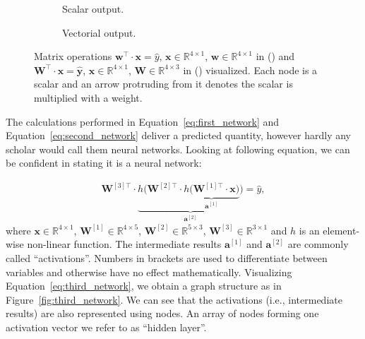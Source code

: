 \begin{figure}[!htb]
    \centering
    \begin{subfigure}{0.4\textwidth}
      \centering
    
      \caption{Scalar output.}
      \label{fig:first_network}
  \end{subfigure}
  \begin{subfigure}{0.4\textwidth}
      \centering
    
      \caption{Vectorial output.}
      \label{fig:second_network}
  \end{subfigure}
  \caption{Matrix operations $\bm{w}^\top \cdot \bm{x} = \hat{y}$, $\bm{x} \in \mathds{R}^{4 \times 1}$, $\bm{w} \in \mathds{R}^{4 \times 1}$ in () and $\bm{W}^\top \cdot \bm{x} = \hat{\bm{y}}$, $\bm{x} \in \mathds{R}^{4 \times 1}$, $\bm{W} \in \mathds{R}^{4 \times 3}$ in () visualized. Each node is a scalar and an arrow protruding from it denotes the scalar is multiplied with a weight.}
\label{fig:first_second_network}
\end{figure}
\FloatBarrier

\noindent The calculations performed in Equation~\ref{eq:first_network} and Equation~\ref{eq:second_network} deliver a predicted quantity, however hardly any scholar would call them neural networks. Looking at following equation, we can be confident in stating it is a neural network:

\begin{align} \label{eq:third_network}
    \bm{W}^{[3]\top} \cdot \underbrace{h \big( \bm{W}^{[2]\top} \cdot \underbrace{h \big( \bm{W}^{[1]\top} \cdot \bm{x} \big)}_{\bm{a}^{[1]}} \big)}_{\bm{a}^{[2]}} = \hat{y},
\end{align}where $\bm{x} \in \mathds{R}^{4 \times 1}$, $\bm{W}^{[1]} \in \mathds{R}^{4 \times 5}$, $\bm{W}^{[2]} \in \mathds{R}^{5 \times 3}$, $\bm{W}^{[3]} \in \mathds{R}^{3 \times 1}$ and $h$ is an element-wise non-linear function. The intermediate results $\bm{a}^{[1]}$ and $\bm{a}^{[2]}$ are commonly called \enquote{activations}. Numbers in brackets are used to differentiate between variables and otherwise have no effect mathematically. Visualizing Equation~\ref{eq:third_network}, we obtain a graph structure as in Figure~\ref{fig:third_network}. We can see that the activations (i.e., intermediate results) are also represented using nodes. An array of nodes forming one activation vector we refer to as \enquote{hidden layer}.

